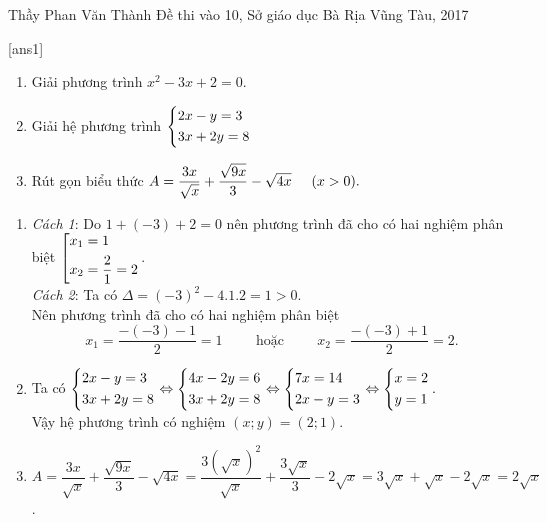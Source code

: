 \begin{name}
{Thầy  Phan Văn Thành}
{Đề thi vào 10, Sở giáo dục Bà Rịa Vũng Tàu, 2017}
\end{name}
\setcounter{ex}{0}
[ans1]
\begin{ex}%
    \hfill
    \begin{enumerate}
        \item Giải phương trình $x^2 - 3x + 2 = 0$.
        \item Giải hệ phương trình $\left\{\begin{aligned}&2x - y= 3\\&3x + 2y = 8\end{aligned}\right.$
        \item Rút gọn biểu thức $A = \dfrac{3x}{\sqrt{x}} + \dfrac{\sqrt{9x}}{3} - \sqrt{4x} \hspace{0,5cm}(x > 0).$
    \end{enumerate}
\loigiai
    {
    \begin{enumerate}
        \item \textit{Cách 1}: Do $1 + (-3) + 2 = 0$ nên phương trình đã cho có hai nghiệm phân biệt $\left[\begin{aligned}&x_1 = 1\\&x_2 = \dfrac{2}{1} = 2\end{aligned}\right.$.\\
        \textit{Cách 2}: Ta có $\Delta = (-3)^2 - 4.1.2 = 1 > 0$.\\
        Nên phương trình đã cho có hai nghiệm phân biệt $$x_1 = \dfrac{-(-3) - 1}{2} = 1 \hspace{1cm} \textrm{hoặc}\hspace{1cm} x_2 = \dfrac{-(-3) + 1}{2} = 2.$$
        \item Ta có $\left\{\begin{aligned}&2x - y = 3\\&3x + 2y = 8\end{aligned}\right.\Leftrightarrow \left\{\begin{aligned}& 4x - 2y = 6\\ & 3x + 2y = 8\end{aligned}\right.\Leftrightarrow \left\{\begin{aligned}& 7x = 14\\ & 2x - y = 3\end{aligned}\right. \Leftrightarrow \left\{\begin{aligned}& x = 2 \\ & y = 1\end{aligned}\right..$\\
        Vậy hệ phương trình có nghiệm $(x; y)=(2; 1)$.
        \item $A = \dfrac{3x}{\sqrt{x}} + \dfrac{\sqrt{9x}}{3} - \sqrt{4x} = \dfrac{3(\sqrt{x})^2}{\sqrt{x}} + \dfrac{3\sqrt{x}}{3} - 2\sqrt{x} = 3\sqrt{x} + \sqrt{x} - 2\sqrt{x} = 2\sqrt{x}$.
    \end{enumerate}
    }
\end{ex}

